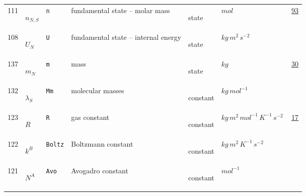 \begin{longtable}{|p{1cm}|p{2.5cm}|p{4.5cm}|p{8cm}|p{3.0cm}|p{3cm}|p{1cm}|}
            111
             & \hypertarget{"v:111"}{ $ {n}{_{N, S}} $}
             & \verb|n|
             & fundamental state -- molar mass
             & \begin{lay}state \end{lay}
             & $ mol \, $
             &                 \hyperlink{"e:93"}{ 93 }
                 \\
            108
             & \hypertarget{"v:108"}{ $ {U}{_{N}} $}
             & \verb|U|
             & fundamental state -- internal energy
             & \begin{lay}state \end{lay}
             & $ kg \,m^{2} \,s^{-2} \, $
             & \\
            137
             & \hypertarget{"v:137"}{ $ {m}{_{N}} $}
             & \verb|m|
             & mass
             & \begin{lay}state \end{lay}
             & $ kg \, $
             &                 \hyperlink{"e:30"}{ 30 }
                 \\
            132
             & \hypertarget{"v:132"}{ $ {{\lambda}}{_{S}} $}
             & \verb|Mm|
             & molecular masses
             & \begin{lay}constant \end{lay}
             & $ kg \,mol^{-1} \, $
             & \\
            123
             & \hypertarget{"v:123"}{ $ {R}{_{}} $}
             & \verb|R|
             & gas constant
             & \begin{lay}constant \end{lay}
             & $ kg \,m^{2} \,mol^{-1} \,K^{-1} \,s^{-2} \, $
             &                 \hyperlink{"e:17"}{ 17 }
                 \\
            122
             & \hypertarget{"v:122"}{ $ {{k^B}}{_{}} $}
             & \verb|Boltz|
             & Boltzmann constant
             & \begin{lay}constant \end{lay}
             & $ kg \,m^{2} \,K^{-1} \,s^{-2} \, $
             & \\
            121
             & \hypertarget{"v:121"}{ $ {{N^A}}{_{}} $}
             & \verb|Avo|
             & Avogadro constant
             & \begin{lay}constant \end{lay}
             & $ mol^{-1} \, $
             & \\

\end{longtable}
